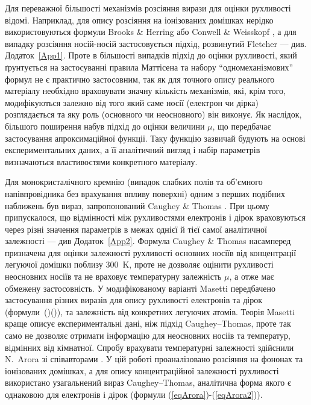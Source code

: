 \documentclass[fleqn,twoside,twocolumn,nofootinbib,showkeys]{revtex4} %
\begin{document}
Для переважної більшості механізмів розсіяння вирази для оцінки рухливості відомі.
Наприклад, для опису розсіяння на іонізованих домішках нерідко використовуються формули Brooks \& Herring
або Conwell \& Weisskopf \cite{Seeger2004}, а для випадку розсіяння носій-носій  застосовується підхід, розвинутий Fletcher \cite{Fletcher1957}
--- див. Додаток~\ref{App1}.
Проте в більшості випадків підхід до оцінки рухливості,
який ґрунтується на застосуванні правила Маттісена та набору ``одномеханізмових'' формул не є
практично застосовним, так як для точного опису реального матеріалу необхідно враховувати значну кількість механізмів, які, крім того,
модифікуються залежно від того який саме носії (електрон чи дірка) розглядається та яку роль (основного чи неосновного) він виконує.
Як наслідок, більшого поширення набув підхід до оцінки величини $\mu$,
що передбачає застосування апроксимаційної функції.
Таку функцію зазвичай будують на основі експериментальних даних, а її аналітичний вигляд і набір параметрів визначаються властивостями конкретного матеріалу.

Для монокристалічного кремнію (випадок слабких полів та об'ємного напівпровідника без врахування впливу поверхні) одним
з перших подібних наближень був вираз, запропонований   Caughey \& Thomas \cite{Caughey1967}.
При цьому припускалося, що відмінності між рухливостями електронів і дірок враховуються через різні значення параметрів
в межах однієї й тієї самої аналітичної залежності --- див Додаток~\ref{App2}.
Формула Caughey \& Thomas насамперед призначена для оцінки залежності рухливості основних носіїв від концентрації легуючої домішки поблизу 300~K,
проте не дозволяє оцінити рухливості неосновних носіїв та не враховує температурну залежність $\mu$, а отже має обмежену застосовність.
У модифікованому варіанті Masetti \cite{Masetti1983} передбачено застосування різних виразів для опису рухливості електронів та дірок (формули~()()),
та залежність від конкретних легуючих атомів.
Теорія Masetti краще описує експериментальні дані, ніж підхід  Caughey--Thomas, проте так само не дозволяє отримати інформацію для неосновних носіїв та
температур, відмінних від кімнатної.
Спробу врахувати температурні залежності здійснили N.~Arora зі співавторами \cite{Arora1982}.
У цій роботі проаналізовано розсіяння на фононах та іонізованих домішках,
а для опису концентраційної залежності рухливості використано узагальнений вираз Caughey–Thomas,
аналітична форма якого є однаковою для електронів і дірок (формули (\ref{eqArora})-(\ref{eqArora2})).
\end{document}
